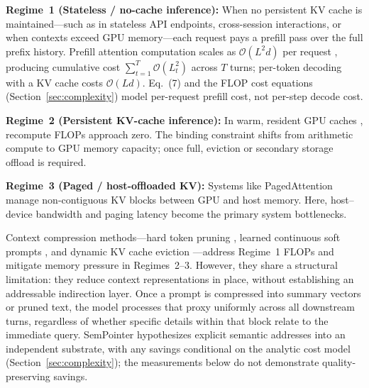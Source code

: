 \documentclass[conference]{IEEEtran}
\begin{document}
\textbf{Regime~1 (Stateless / no-cache inference):} When no persistent KV cache is maintained---such as in stateless API endpoints, cross-session interactions, or when contexts exceed GPU memory---each request pays a prefill pass over the full prefix history. Prefill attention computation scales as $\mathcal{O}(L^2 d)$ per request \cite{vaswani2017attention}, producing cumulative cost $\sum_{t=1}^T \mathcal{O}(L_t^2)$ across $T$ turns; per-token decoding with a KV cache costs $\mathcal{O}(Ld)$. Eq.~(7) and the FLOP cost equations (Section~\ref{sec:complexity}) model per-request prefill cost, not per-step decode cost.

\textbf{Regime~2 (Persistent KV-cache inference):} In warm, resident GPU caches \cite{kwon2023pagedattention}, recompute FLOPs approach zero. The binding constraint shifts from arithmetic compute to GPU memory capacity; once full, eviction or secondary storage offload is required.

\textbf{Regime~3 (Paged / host-offloaded KV):} Systems like PagedAttention \cite{kwon2023pagedattention} manage non-contiguous KV blocks between GPU and host memory. Here, host--device bandwidth and paging latency become the primary system bottlenecks.

Context compression methods---hard token pruning \cite{jiang2023llmlingua, jiang2024longllmlingua, pan2024llmlingua2}, learned continuous soft prompts \cite{mu2023gist, chevalier2023autocompressors, ge2024icae, li2025500xcompressor}, and dynamic KV cache eviction \cite{kim2024ccm, liu2025sac}---address Regime~1 FLOPs and mitigate memory pressure in Regimes~2--3. However, they share a structural limitation: they reduce context representations in place, without establishing an addressable indirection layer. Once a prompt is compressed into summary vectors or pruned text, the model processes that proxy uniformly across all downstream turns, regardless of whether specific details within that block relate to the immediate query. SemPointer hypothesizes explicit semantic addresses into an independent substrate, with any savings conditional on the analytic cost model (Section~\ref{sec:complexity}); the measurements below do not demonstrate quality-preserving savings.
\end{document}
